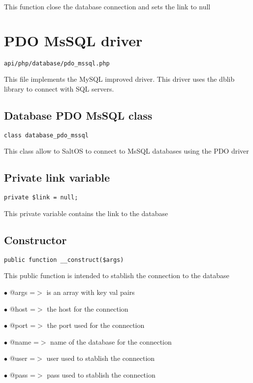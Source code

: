 \documentclass[a4paper]{book}
\begin{document}
This function close the database connection and sets the link to null

\hypertarget{toc339}{}
\section{PDO MsSQL driver}

\begin{lstlisting}
api/php/database/pdo_mssql.php
\end{lstlisting}

This file implements the MySQL improved driver. This driver uses the dblib library to connect
with SQL servers.

\hypertarget{toc340}{}
\subsection{Database PDO MsSQL class}

\begin{lstlisting}
class database_pdo_mssql
\end{lstlisting}

This class allow to SaltOS to connect to MsSQL databases using the PDO driver

\hypertarget{toc341}{}
\subsection{Private link variable}

\begin{lstlisting}
private $link = null;
\end{lstlisting}

This private variable contains the link to the database

\hypertarget{toc342}{}
\subsection{Constructor}

\begin{lstlisting}
public function __construct($args)
\end{lstlisting}

This public function is intended to stablish the connection to the database

\begin{compactitem}
\item[\color{myblue}$\bullet$] @args =$>$ is an array with key val pairs
\item[\color{myblue}$\bullet$] @host =$>$ the host for the connection
\item[\color{myblue}$\bullet$] @port =$>$ the port used for the connection
\item[\color{myblue}$\bullet$] @name =$>$ name of the database for the connection
\item[\color{myblue}$\bullet$] @user =$>$ user used to stablish the connection
\item[\color{myblue}$\bullet$] @pass =$>$ pass used to stablish the connection
\end{compactitem}
\end{document}
